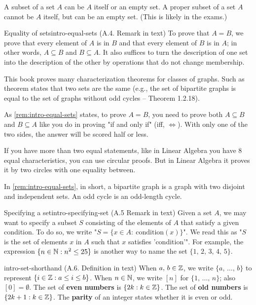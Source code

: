 \documentclass[../src/handouts/main.tex]{subfiles}
\begin{document}
A subset of a set $A$ can be $A$ itself or an empty set. A proper subset of a set $A$ cannot be $A$ itself, but can be an empty set. (This is likely in the exams.)

\begin{remark}{Equality of sets}{intro-equal-sets}
  (A.4. Remark in text)
  To prove that $A = B$, we prove that every element of $A$ is in $B$ and that every element of $B$ is in $A$; in other words, $A \subseteq B$ and $B \subseteq A$. It also suffices to turn the description of one set into the description of the other by operations that do not change membership.

  This book proves many characterization theorems for classes of graphs. Such as theorem states that two sets are the same (e.g., the set of bipartite graphs is equal to the set of graphs without odd cycles -- Theorem 1.2.18).
\end{remark}

As \cref{rem:intro-equal-sets} states, to prove $A = B$, you need to prove both $A \subseteq B$ and $B \subseteq A$ like you do in proving "if and only if" (iff, $\iff$). With only one of the two sides, the answer will be scored half or less.

If you have more than two equal statements, like in Linear Algebra you have 8 equal characteristics, you can use circular proofs. But in Linear Algebra it proves it by two circles with one equality between.

In \cref{rem:intro-equal-sets}, in short, a bipartite graph is a graph with two disjoint and independent sets. An odd cycle is an odd-length cycle.

\begin{remark}{Specifying a set}{intro-specifying-set}
  (A.5 Remark in text)
  Given a set $A$, we may want to specify a subset $S$ consisting of the elements of $A$ that satisfy a given condition. To do so, we write "$S = \{ x \in A:\ \text{condition}(x)\}$". We read this as "$S$ is the set of elements $x$ in $A$ such that $x$ satisfies 'condition'". For example, the expression $\{ n \in \mathbb{N} : n^2 \leq 25 \}$ is another way to name the set $\{ 1,\, 2,\, 3,\, 4,\, 5 \}$.
\end{remark}

\begin{definition}{}{intro-set-shorthand}
  (A.6. Definition in text)
  When $a,\, b \in \mathbb{Z}$, we write $\{a,\, \ldots,\, b\}$ to represent $\{ i \in \mathbb{Z}: a \leq i \leq b \}$.
  When $n \in \mathbb{N}$, we write $[n]$ for $\{1,\, \ldots,\, n\}$; also $[0] = \emptyset$.
  The set of \textbf{even numbers} is $\{ 2 k : k \in \mathbb{Z} \}$.
  The set of \textbf{old numbers} is $\{ 2 k + 1 : k \in \mathbb{Z} \}$.
  The \textbf{parity} of an integer states whether it is even or odd.
\end{definition}
\end{document}
